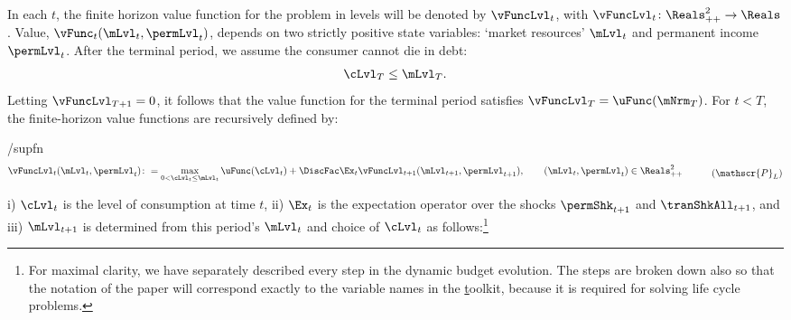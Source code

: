 \documentclass[BufferStockTheory]{subfiles}
\begin{document}
In each $t$, the finite horizon value function for the problem in levels will be denoted by $\vFuncLvl_{t}$, with $\vFuncLvl_{t}\colon \Reals_{++}^{2}\rightarrow \Reals$. Value, $\vFunc_{t}(\mLvl_{t}, \permLvl_{t})$, depends on two strictly positive state variables: `market resources' $\mLvl_{t}$ and permanent income $\permLvl_{t}$.
After the terminal period, we assume the consumer cannot die in debt:
%
\begin{equation}\label{eq:NoDebtAtDeath}
\cLvl_{T} \leq  \mLvl_{T} .
\end{equation}
%
Letting $\vFuncLvl_{T+1} = 0$, it follows that the value function for the terminal period satisfies $\vFuncLvl_{T} = \uFunc(\mNrm_{T})$.
For $t<T$, the finite-horizon value functions are recursively defined by:


%
\begin{verbatimwrite}{\EqDir/supfn}
  \begin{equation}\begin{gathered}\begin{aligned}\label{eq:levelRecProblem}
    \vFuncLvl_{t}(\mLvl_{t}, \permLvl_{t})\colon & = \max_{0 < \cLvl_{t} \leq \mLvl_{t}} \uFunc(\cLvl_{t}) + \DiscFac \Ex_{t}\vFuncLvl_{t+1}(\mLvl_{t+1}, \permLvl_{t+1}), \qquad (\mLvl_{t}, \permLvl_{t})\in \Reals_{++}^{2} 
  \end{aligned}\end{gathered}
\tag{$\mathscr{P}_{L}$}
\end{equation}
\end{verbatimwrite} \unskip

 i) $\cLvl_{t}$ is the level of consumption at time $t$, ii) $\Ex_{t}$ is the expectation operator over the shocks $\permShk_{t+1}$ and $\tranShkAll_{t+1}$\hypertarget{checkRestrictions}{}\hypertarget{DBCparts}{}, and iii) $\mLvl_{t+1}$ is determined from this period's $\mLvl_{t}$ and choice of $\cLvl_{t}$ as follows:\footnote{For maximal clarity, we have separately described every step in the dynamic budget evolution.
The steps are broken down also so that the notation of the paper will correspond exactly to the variable names in the \href{https://github.com/econ-ark/HARK} toolkit, because it is required for solving life cycle problems.}%
%
\end{document}
